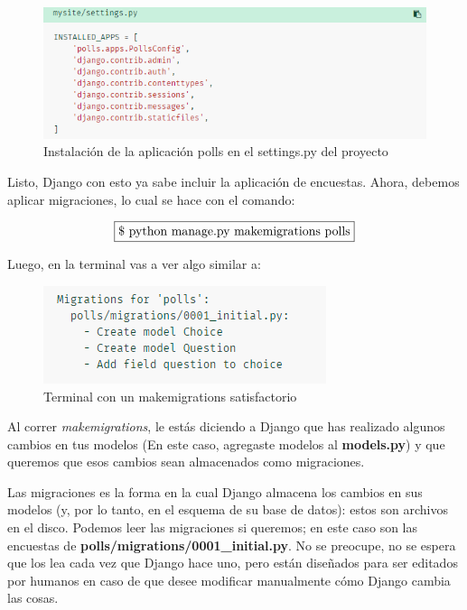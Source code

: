 \documentclass[10pt]{article}
\newcommand{\django}[1]{{\textcolor{G}{Django} #1}}
\begin{document}
\begin{figure}[H]
	\begin{center}
		\includegraphics[scale=0.9]{figuras/3/32/323/img1.png}
		\renewcommand{\arraystretch}{1.3}
		\caption{Instalación de la aplicación polls en el \textcolor{G}{settings.py} del proyecto }
	\end{center}
\end{figure}


Listo, \django{} con esto ya sabe incluir la aplicación de encuestas. Ahora, debemos aplicar migraciones, lo cual se hace con el comando:

$$\fbox{\$ python manage.py makemigrations polls}$$

Luego, en la terminal vas a ver algo similar a:

\begin{figure}[H]
\begin{center}
\includegraphics[scale=1]{figuras/3/32/323/img2.png}
\renewcommand{\arraystretch}{1.3}
\caption{Terminal con un makemigrations satisfactorio}
\end{center}
\end{figure}


Al correr \textit{makemigrations}, le estás diciendo a Django que has realizado algunos cambios en tus modelos (En este caso, agregaste modelos al \textbf{models.py}) y que queremos que esos cambios sean almacenados como migraciones.


Las migraciones es la forma en la cual \django{} almacena los cambios en sus modelos (y, por lo tanto, en el esquema de su base de datos): estos son archivos en el disco. Podemos leer las migraciones si queremos; en este caso son las encuestas de \textbf{polls/migrations/0001\_initial.py}. No se preocupe, no se espera que los lea cada vez que Django hace uno, pero están diseñados para ser editados por humanos en caso de que desee modificar manualmente cómo \django{} cambia las cosas.
\end{document}

